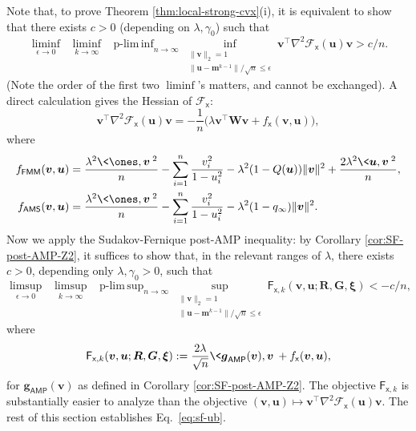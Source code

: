 \documentclass[]{article}
\def\bR{{\boldsymbol R}}
\def\sx{{\mathsf x}}
\def\bW{{\boldsymbol W}}
\def\cF{{\mathcal F}}
\def\bv{{\boldsymbol V}}
\def\bu{{\boldsymbol u}}
\def\bg{{\boldsymbol g}}
\def\bv{{\boldsymbol v}}
\def\bxi{{\boldsymbol \xi}}
\def\bW{{\boldsymbol W}}
\def\bG{{\boldsymbol G}}
\def\cF{{\mathcal F}}
\def\bv{{\boldsymbol v}}
\def\bu{{\boldsymbol u}}
\def\bg{{\boldsymbol g}}
\def\bbm{{\boldsymbol m}}
\def\AMP{\mathsf{AMP}}
\def\sF{\mathsf{F}}
\DeclareMathOperator*{\plimsup}{p-lim\,sup}
\DeclareMathOperator*{\pliminf}{p-lim\,inf}
\def\FMM{\mathsf{FMM}}
\def\AMS{\mathsf{AMS}}
\begin{document}
Note that, to prove Theorem \ref{thm:local-strong-cvx}(i),
it is equivalent to show that there exists $c > 0$ (depending on $\lambda,\gamma_0$) such that 
\begin{equation}
    \liminf_{\epsilon \rightarrow 0}\;\;
    \liminf_{k \rightarrow \infty}\;\;
    \pliminf_{n \rightarrow \infty} 
    \inf_{ \substack{\| \bv \|_2 = 1 \\ \| \bu - \bbm^{k-1} \|/\sqrt{n} \leq \epsilon } }
        \bv^\top \nabla^2 \cF_{\sx} (\bu) \bv
        > c/n.
\end{equation}
(Note the order of the first two $\liminf$'s matters, and cannot be exchanged).
A direct calculation gives the Hessian of $\cF_{\sx}$:
\begin{equation}
\label{eq:local-eig}
    \bv^\top\nabla^2 \cF_{\sx}(\bu)\bv
        = 
        -\frac1n
        \Big(
            \lambda \bv^\top\bW\bv
            +
            f_{\sx}(\bv,\bu)
        \Big),
\end{equation}
where
\begin{equation}
\begin{aligned}
    f_{\FMM}(\bv,\bu)
        &= 
        \frac{\lambda^2 \< \ones , \bv \>^2}{n}
        - 
        \sum_{i=1}^n \frac{v_i^2}{1 - u_i^2}
        -
        \lambda^2(1-Q(\bu))\| \bv \|^2
        +
        \frac{2\lambda^2\< \bu,\bv \>^2}{n},
    \\
    f_{\AMS}(\bv,\bu)
        &= 
        \frac{\lambda^2 \< \ones , \bv \>^2}{n}
        - 
        \sum_{i=1}^n \frac{v_i^2}{1 - u_i^2}
        -
        \lambda^2(1-q_\infty)\| \bv \|^2.
\end{aligned}
\end{equation}
Now we apply the Sudakov-Fernique post-AMP inequality:
by Corollary \ref{cor:SF-post-AMP-Z2}, it suffices to show that,
in the relevant ranges of $\lambda$,
there exists $c > 0$, 
depending only $\lambda,\gamma_0 > 0$,
such that 
\begin{equation}
\label{eq:sf-ub}
    \limsup_{\epsilon \rightarrow 0}\;\;
    \limsup_{k \rightarrow \infty}\;\;
    \plimsup_{n \rightarrow \infty} 
    \sup_{ \substack{\| \bv \|_2 = 1 \\ \| \bu - \bbm^{k-1} \|/\sqrt{n} \leq \epsilon } }
    \sF_{\sx,k}(\bv,\bu;\bR,\bG,\bxi)
    < -c/n,
\end{equation}
where 
\begin{equation}
    \sF_{\sx,k}(\bv,\bu;\bR,\bG,\bxi)
        :=
        \frac{2\lambda}{\sqrt{n}} \< \bg_{\AMP}(\bv) , \bv \> 
        + f_{\sx}(\bv,\bu),
\end{equation}
for $\bg_{\AMP}(\bv)$ as defined in Corollary \ref{cor:SF-post-AMP-Z2}.
The objective $\sF_{\sx,k}$ is substantially easier to analyze than the objective $(\bv,\bu) \mapsto \bv^\top \nabla^2 \cF_{\sx}(\bu)\bv$.
The rest of this section establishes Eq.~\eqref{eq:sf-ub}.
\end{document}
